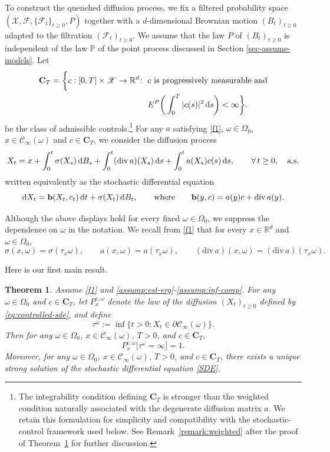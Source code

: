\documentclass[11pt]{article}
\renewcommand{\d}{{\rm d}}
\newcommand{\R}{\mathbb R}
\renewcommand{\P}{\mathbb P}
\newtheorem{theorem}{Theorem}[section]
\theoremstyle{rem}
\begin{document}
To construct the quenched diffusion process, we fix a filtered probability space
$(\mathscr X,\mathcal F,\{\mathcal F_t\}_{t\ge0},P)$ together with a $d$-dimensional Brownian motion $(B_t)_{t\ge0}$ adapted to the filtration $(\mathcal F_t)_{t\ge0}$. We assume that the law $P$ of $(B_t)_{t\ge0}$ is independent of the law $\P$ of the point process discussed in Section \ref{sec-assume-models}. Let
\begin{equation}\label{def-class-C}
\begin{aligned}
\mathbf C_T
=
\bigg\{
c:[0,T]\times\mathscr X\to\R^d
\colon\;
&c \mbox{ is progressively measurable and}
\\
&E^P\bigg(
\int_0^T|c(s)|^2\,\d s
\bigg)
<\infty
\bigg\}.
\end{aligned}
\end{equation}
be the class of admissible controls.\footnote{
The integrability condition defining $\mathbf C_T$ is stronger than the
weighted condition naturally associated with the degenerate diffusion matrix
$a$. We retain this formulation for simplicity and compatibility with the
stochastic-control framework used below. See Remark~\ref{remark:weighted}
after the proof of Theorem~\ref{theorem 1} for further discussion.
} 
For any $a$ satisfying \ref{f1}, $\omega\in\Omega_0$,
$x\in\mathcal C_\infty(\omega)$ and $c\in\mathbf C_T$, we consider the diffusion process
\begin{equation}\label{eq:controlled-sde}
X_t
=
x
+
\int_0^t \sigma(X_s)\,\d B_s
+
\int_0^t (\mathrm{div}\,a)(X_s)\,\d s
+
\int_0^t a(X_s)c(s)\,\d s,
\qquad
\forall\, t\ge0,
\quad\mbox{a.s.}
\end{equation}
written equivalently as the stochastic differential equation
\begin{equation}\label{SDE}
\d X_t
=
\mathbf b(X_t,c_t)\,\d t
+
\sigma(X_t)\,\d B_t,
\qquad
\mbox{where}
\qquad
\mathbf b(y,c)
=
a(y)c+\mathrm{div}\,a(y).
\end{equation}

Although the above displays hold for every fixed $\omega\in\Omega_0$, we suppress the dependence on $\omega$ in the notation. We recall from \ref{f1} that for every $x\in\R^d$ and $\omega\in\Omega_0$,
\[
\sigma(x,\omega)=\sigma(\tau_x\omega),
\qquad
a(x,\omega)=a(\tau_x\omega),
\qquad
(\mathrm{div}\,a)(x,\omega)
=
(\mathrm{div}\,a)(\tau_x\omega).
\]

Here is our first main result.

\begin{theorem}\label{theorem 1}
Assume \ref{f1} and \ref{assump:est-erg}-\ref{assump:inf-comp}. For any $\omega\in\Omega_0$ and $c\in\mathbf C_T$, let
$P^{c,\omega}_x$ denote the law of the diffusion $(X_t)_{t\ge0}$ defined by \eqref{eq:controlled-sde}, and define
\[
\tau^\omega
:=
\inf\{t>0:X_t\in\partial\mathcal C_\infty(\omega)\}.
\]
Then for any $\omega\in\Omega_0$, $x\in\mathcal C_\infty(\omega)$, $T>0$, and $c\in\mathbf C_T$,
\[
P_x^{c,\omega}\big[\tau^\omega=\infty\big]=1.
\]
Moreover, for any $\omega\in\Omega_0$, $x\in\mathcal C_\infty(\omega)$, $T>0$, and $c\in\mathbf C_T$, there exists a unique strong solution of the stochastic differential equation \eqref{SDE}.
\end{theorem}
\end{document}
